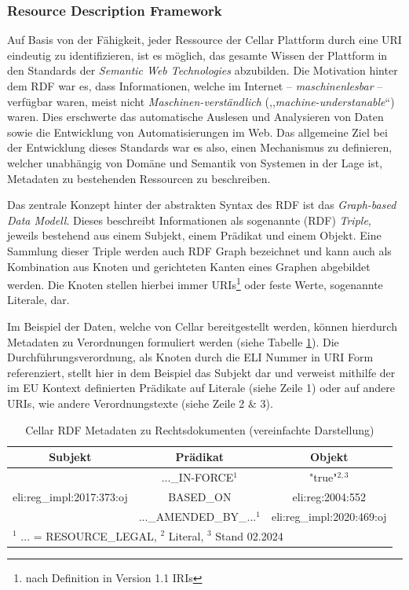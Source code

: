 \subsubsection{Resource Description Framework}

    Auf Basis von der Fähigkeit, jeder Ressource der Cellar Plattform durch eine \ac{URI} eindeutig zu identifizieren, ist es möglich, das gesamte Wissen der Plattform in den Standards der \textit{Semantic Web Technologies} abzubilden.
    Die Motivation hinter dem \acf{RDF} war es, dass Informationen, welche im Internet -- \textit{maschinenlesbar} -- verfügbar waren, meist nicht \textit{Maschinen-verständlich} (,,\textit{machine-understanable}``) waren.
    Dies erschwerte das automatische Auslesen und Analysieren von Daten sowie die Entwicklung von Automatisierungen im Web.
    Das allgemeine Ziel bei der Entwicklung dieses Standards war es also, einen Mechanismus zu definieren, welcher unabhängig von Domäne und Semantik von Systemen in der Lage ist, Metadaten zu bestehenden Ressourcen zu beschreiben. \cite[Abs. 1]{eu_rdf_w3c} 
    
    \medskip
    Das zentrale Konzept hinter der abstrakten Syntax des \ac{RDF} ist das \textit{Graph-based Data Modell}.
    Dieses beschreibt Informationen als sogenannte (\ac{RDF}) \textit{Triple}, jeweils bestehend aus einem Subjekt, einem Prädikat und einem Objekt. 
    Eine Sammlung dieser Triple werden auch \ac{RDF} Graph bezeichnet und kann auch als Kombination aus Knoten und gerichteten Kanten eines Graphen abgebildet werden.
    Die Knoten stellen hierbei immer \acp{URI}\footnote{nach Definition in Version 1.1 \acp{IRI}} oder feste Werte, sogenannte Literale, dar.
    \cite[Abs. 1.1]{eu_rdf_concepts}


    Im Beispiel der Daten, welche von Cellar bereitgestellt werden, können hierdurch Metadaten zu Verordnungen formuliert werden (siehe Tabelle \ref{tab:rdf_example}).
    Die Durchführungsverordnung, als Knoten durch die \ac{ELI} Nummer in \ac{URI} Form referenziert, stellt hier in dem Beispiel das Subjekt dar und verweist mithilfe der im EU Kontext definierten Prädikate auf Literale (siehe Zeile 1) oder auf andere \acp{URI}, wie andere Verordnungstexte (siehe Zeile 2 \& 3). 
    \begin{table}[h]
        \centering
        \begin{tabular}{|c|c|c|} \hline
             Subjekt&  Prädikat& Objekt\\ \hline\hline
             &  ...\_IN-FORCE$^1$& "true"$^{2,3}$\\ \cline{2-3}
             eli:reg\_impl:2017:373:oj&  BASED\_ON& eli:reg:2004:552\\ \cline{2-3} 
             &  ...\_AMENDED\_BY\_...$^1$& eli:reg\_impl:2020:469:oj\\ \hline
     \multicolumn{3}{l}{\footnotesize $^1$ ... = RESOURCE\_LEGAL, $^2$ Literal, $^3$ Stand 02.2024}\\
        \end{tabular}
        \caption{Cellar RDF Metadaten zu Rechtsdokumenten (vereinfachte Darstellung)}
        \label{tab:rdf_example}
    \end{table}
        

